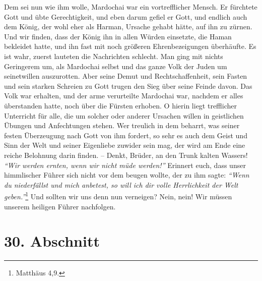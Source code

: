Dem sei nun wie ihm wolle, Mardochai war ein vortrefflicher Mensch. Er fürchtete
Gott und übte Gerechtigkeit, und eben darum gefiel er Gott, und endlich auch dem
König, der wohl eher als Harman, Ursache gehabt hätte, auf ihn zu zürnen. Und
wir finden, dass der König ihn in allen Würden einsetzte, die Haman bekleidet
hatte, und ihn fast mit noch größeren Ehrenbezeigungen überhäufte. Es ist wahr,
zuerst lauteten die Nachrichten schlecht. Man ging mit nichts Geringerem um, als
Mardochai selbst und das ganze Volk der Juden um seinetwillen auszurotten. Aber
seine Demut und Rechtschaffenheit, sein Fasten und sein starken
Schreien zu
Gott trugen den Sieg über seine Feinde davon. Das Volk war erhalten, und der
arme
verurteilte Mardochai war, nachdem er alles überstanden hatte, noch über die
Fürsten erhoben. O hierin liegt trefflicher Unterricht für alle, die um solcher
oder anderer Ursachen willen in geistlichen Übungen und Anfechtungen stehen.
Wer treulich in dem beharrt, was seiner festen Überzeugung
nach Gott von ihm
fordert, so sehr es auch dem Geist und Sinn der
Welt und seiner Eigenliebe
zuwider sein mag, der wird am Ende eine reiche Belohnung darin
finden. -- Denkt,
Brüder, an den Trunk kalten Wassers!
\textit{"`Wir werden ernten, wenn wir nicht müde
werden!"'}
Erinnert euch, dass unser himmlischer Führer sich nicht vor dem
beugen
wollte, der zu ihm sagte:
\textit{"`Wenn du niederfällst und mich anbetest, so will ich
dir volle Herrlichkeit der Welt geben."'}\footnote{Matthäus 4,9.}
Und sollten wir
uns denn nun verneigen? Nein, nein! Wir müssen unserem heiligen Führer
nachfolgen. 

\section{30. Abschnitt} \label{kap9_ab30}

